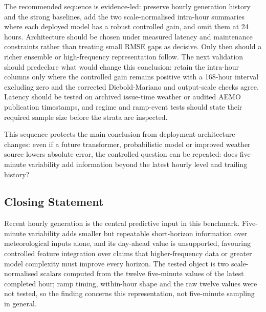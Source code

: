 The recommended sequence is evidence-led: preserve hourly generation history and the strong baselines, add the two scale-normalised intra-hour summaries where each deployed model has a robust controlled gain, and omit them at 24 hours. Architecture should be chosen under measured latency and maintenance constraints rather than treating small RMSE gaps as decisive. Only then should a richer ensemble or high-frequency representation follow. The next validation should predeclare what would change this conclusion: retain the intra-hour columns only where the controlled gain remains positive with a 168-hour interval excluding zero and the corrected Diebold-Mariano and output-scale checks agree. Latency should be tested on archived issue-time weather or audited AEMO publication timestamps, and regime and ramp-event tests should state their required sample size before the strata are inspected.

This sequence protects the main conclusion from deployment-architecture changes: even if a future transformer, probabilistic model or improved weather source lowers absolute error, the controlled question can be repeated: does five-minute variability add information beyond the latest hourly level and trailing history?

\subsection{Closing Statement}

Recent hourly generation is the central predictive input in this benchmark. Five-minute variability adds smaller but repeatable short-horizon information over meteorological inputs alone, and its day-ahead value is unsupported, favouring controlled feature integration over claims that higher-frequency data or greater model complexity must improve every horizon. The tested object is two scale-normalised scalars computed from the twelve five-minute values of the latest completed hour; ramp timing, within-hour shape and the raw twelve values were not tested, so the finding concerns this representation, not five-minute sampling in general.
